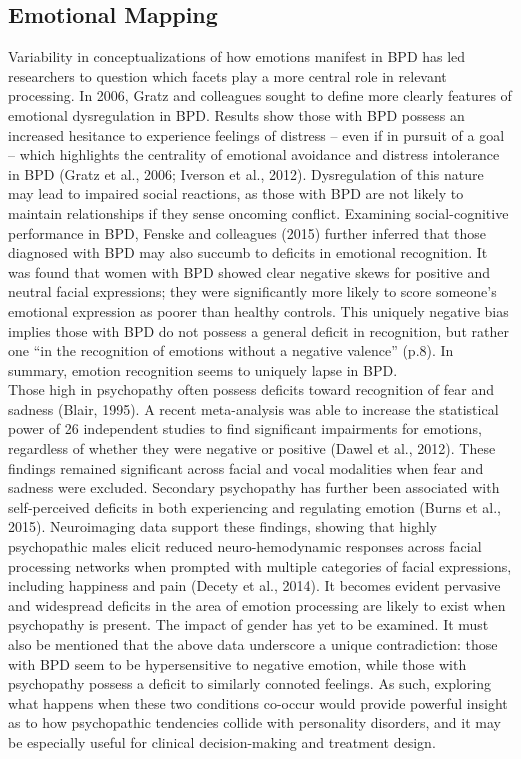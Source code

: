 \documentclass[
  man,floatsintext]{apa7}
\begin{document}
\hypertarget{emotional-mapping}{%
\subsection{Emotional Mapping}\label{emotional-mapping}}

Variability in conceptualizations of how emotions manifest in BPD has led researchers to question which facets play a more central role in relevant processing. In 2006, Gratz and colleagues sought to define more clearly features of emotional dysregulation in BPD. Results show those with BPD possess an increased hesitance to experience feelings of distress -- even if in pursuit of a goal -- which highlights the centrality of emotional avoidance and distress intolerance in BPD (Gratz et al., 2006; Iverson et al., 2012). Dysregulation of this nature may lead to impaired social reactions, as those with BPD are not likely to maintain relationships if they sense oncoming conflict. Examining social-cognitive performance in BPD, Fenske and colleagues (2015) further inferred that those diagnosed with BPD may also succumb to deficits in emotional recognition. It was found that women with BPD showed clear negative skews for positive and neutral facial expressions; they were significantly more likely to score someone's emotional expression as poorer than healthy controls. This uniquely negative bias implies those with BPD do not possess a general deficit in recognition, but rather one ``in the recognition of emotions without a negative valence'' (p.8). In summary, emotion recognition seems to uniquely lapse in BPD.\\
Those high in psychopathy often possess deficits toward recognition of fear and sadness (Blair, 1995). A recent meta-analysis was able to increase the statistical power of 26 independent studies to find significant impairments for emotions, regardless of whether they were negative or positive (Dawel et al., 2012). These findings remained significant across facial and vocal modalities when fear and sadness were excluded. Secondary psychopathy has further been associated with self-perceived deficits in both experiencing and regulating emotion (Burns et al., 2015). Neuroimaging data support these findings, showing that highly psychopathic males elicit reduced neuro-hemodynamic responses across facial processing networks when prompted with multiple categories of facial expressions, including happiness and pain (Decety et al., 2014). It becomes evident pervasive and widespread deficits in the area of emotion processing are likely to exist when psychopathy is present. The impact of gender has yet to be examined. It must also be mentioned that the above data underscore a unique contradiction: those with BPD seem to be hypersensitive to negative emotion, while those with psychopathy possess a deficit to similarly connoted feelings. As such, exploring what happens when these two conditions co-occur would provide powerful insight as to how psychopathic tendencies collide with personality disorders, and it may be especially useful for clinical decision-making and treatment design.\\
\end{document}
